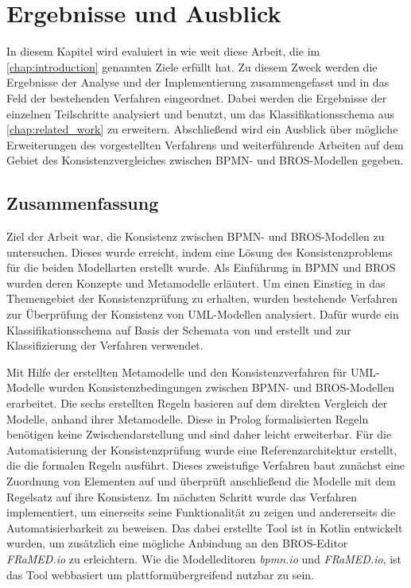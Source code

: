 \chapter{Ergebnisse und Ausblick}
\label{chap:conclusion}

In diesem Kapitel wird evaluiert in wie weit diese Arbeit, die im \cref{chap:introduction} genannten Ziele erfüllt hat.
Zu diesem Zweck werden die Ergebnisse der Analyse und der Implementierung zusammengefasst und in das Feld der bestehenden Verfahren eingeordnet.
Dabei werden die Ergebnisse der einzelnen Teilschritte analysiert und benutzt, um das Klassifikationsschema aus \cref{chap:related_work} zu erweitern.
Abschließend wird ein Ausblick über mögliche Erweiterungen des vorgestellten Verfahrens und weiterführende Arbeiten auf dem Gebiet des Konsistenzvergleiches zwischen BPMN- und BROS-Modellen gegeben.

\section{Zusammenfassung}

Ziel der Arbeit war, die Konsistenz zwischen BPMN- und BROS-Modellen zu untersuchen.
Dieses wurde erreicht, indem eine Lösung des Konsistenzproblems für die beiden Modellarten erstellt wurde.
Als Einführung in BPMN und BROS wurden deren Konzepte und Metamodelle erläutert.
Um einen Einstieg in das Themengebiet der Konsistenzprüfung zu erhalten, wurden bestehende Verfahren zur Überprüfung der Konsistenz von UML-Modellen analysiert.
Dafür wurde ein Klassifikationsschema auf Basis der Schemata von \cite{Usman2008} und \cite{Lucas2009} erstellt und zur Klassifizierung der Verfahren verwendet.

Mit Hilfe der erstellten Metamodelle und den Konsistenzverfahren für UML-Modelle wurden Konsistenzbedingungen zwischen BPMN- und BROS-Modellen erarbeitet.
Die sechs erstellten Regeln basieren auf dem direkten Vergleich der Modelle, anhand ihrer Metamodelle.
Diese in Prolog formalisierten Regeln benötigen keine Zwischendarstellung und sind daher leicht erweiterbar.
Für die Automatisierung der Konsistenzprüfung wurde eine Referenzarchitektur erstellt, die die formalen Regeln ausführt.
Dieses zweistufige Verfahren baut zunächst eine Zuordnung von Elementen auf und überprüft anschließend die Modelle mit dem Regelsatz auf ihre Konsistenz.
Im nächsten Schritt wurde das Verfahren implementiert, um einerseits seine Funktionalität zu zeigen und andererseits die Automatisierbarkeit zu beweisen.
Das dabei erstellte Tool ist in Kotlin entwickelt wurden, um zusätzlich eine mögliche Anbindung an den BROS-Editor \emph{FRaMED.io} zu erleichtern.
Wie die Modelleditoren \emph{bpmn.io} und \emph{FRaMED.io}, ist das Tool webbasiert um plattformübergreifend nutzbar zu sein.

